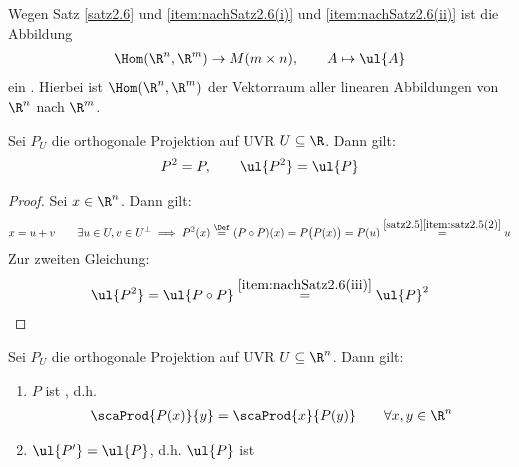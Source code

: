 Wegen Satz \ref{satz2.6} und \ref{item:nachSatz2.6(i)} und \ref{item:nachSatz2.6(ii)} ist die Abbildung
\begin{align*}
	\Hom(\R^n,\R^m)\to M(m\times n),\qquad A\mapsto\ul{A}
\end{align*}
ein .
Hierbei ist $\Hom(\R^n,\R^m)$ der Vektorraum aller linearen Abbildungen von $\R^n$ nach $\R^m$.

\begin{satz}\label{satz2.7}
	Sei $P_U$ die orthogonale Projektion auf UVR $U\subseteq\R$.
	Dann gilt:
	\begin{align*}
		P^2=P,\qquad \ul{P^2}=\ul{P}
	\end{align*}
\end{satz}

\begin{proof}
	Sei $x\in\R^n$. Dann gilt:
	\begin{align*}
		x=u+v\qquad\exists u\in U,v\in U^\perp
		\implies P^2(x)\overset{\Def}{=}(P\circ P)(x)
		=P\big(P(x)\big)
		=P(u)
		\overset{\ref{satz2.5}\ref{item:satz2.5(2)}}{=}
		u
	\end{align*}
	Zur zweiten Gleichung:
	\begin{align*}
		\ul{P^2}=\ul{P\circ P}\overset{\ref{item:nachSatz2.6(iii)}}{=}\ul{P}^2
	\end{align*}
\end{proof}

\begin{satz}\label{satz2.8}
	Sei $P_U$ die orthogonale Projektion auf UVR $U\subseteq\R^n$.
	Dann gilt:
	\begin{enumerate}[label=(\arabic*)]
		\item $P$ ist , d.h. \label{item:satz2.8(1)}
		\begin{align*}
			\scaProd{P(x)}{y}=\scaProd{x}{P(y)}\qquad\forall x,y\in\R^n
		\end{align*}
		\item $\ul{P'}=\ul{P}$, d.h. $\ul{P}$ ist  \label{item:satz2.8(2)}
	\end{enumerate}
\end{satz}

